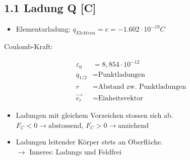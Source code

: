 \subsection*{1.1 Ladung Q [C]}

\begin{itemize}
    \item Elementarladung: $q_{Elektron} = e = - 1.602 \cdot 10^{-19}C$
\end{itemize}

Coulomb-Kraft: 

\begin{minipage}{0.53\linewidth}
    \begin{footnotesize}
        \begin{center}
        \end{center}
    \end{footnotesize}
\end{minipage}
\begin{minipage}{0.46\linewidth}
    \begin{scriptsize}
        \begin{center}
            \begin{align*}
                \varepsilon_0 &= 8,854\cdot10^{-12}
                \\q_{1/2} &= \text{Punktladungen}
                \\r &= \text{Abstand zw. Punktladungen}
                \\\overrightarrow{e_r} &= \text{Einheitsvektor}
            \end{align*}
        \end{center}
    \end{scriptsize}
\end{minipage}
\vspace{1mm}



\begin{itemize}
    \item Ladungen mit gleichem Vorzeichen stossen sich ab.
    \\$F_C<0 \rightarrow \text{abstossend}$,
    $F_C>0 \rightarrow \text{anziehend}$
    \item Ladungen leitender Körper stets an Oberfläche.\\
    $\rightarrow$ Inneres: Ladungs und Feldfrei
\end{itemize}

